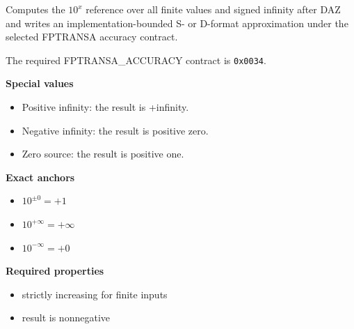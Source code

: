 Computes the $10^x$ reference over all finite values and signed infinity after DAZ and writes an implementation-bounded S- or D-format approximation under the selected FPTRANSA accuracy contract.

The required FPTRANSA\_ACCURACY contract is \texttt{0x0034}.

\textbf{Special values}\par
\begin{itemize}
\item Positive infinity: the result is +infinity.
\item Negative infinity: the result is positive zero.
\item Zero source: the result is positive one.
\end{itemize}

\textbf{Exact anchors}\par
\begin{itemize}
\item $10^{\mathord{\pm}0} = +1$
\item $10^{+\infty} = +\infty$
\item $10^{-\infty} = +0$
\end{itemize}

\textbf{Required properties}\par
\begin{itemize}
\item strictly increasing for finite inputs
\item result is nonnegative
\end{itemize}
